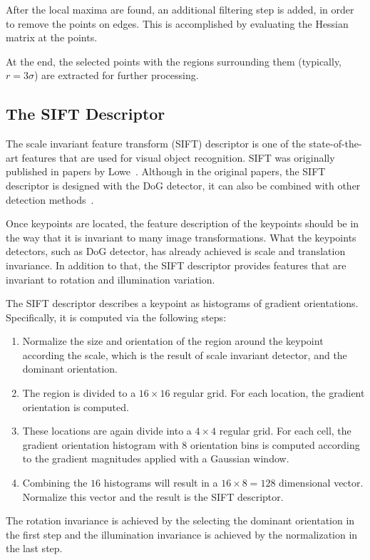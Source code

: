 \documentclass[12pt,final,twoside]{report}
\theoremstyle{plain}
\theoremstyle{definition}
\theoremstyle{remark}
\begin{document}
After the local maxima are found, an additional filtering step is added, in order to remove the points on edges. This is accomplished by evaluating the Hessian matrix at the points.

At the end, the selected points with the regions surrounding them (typically, $r = 3\sigma$) are extracted for further processing.

\subsection{The SIFT Descriptor}
The scale invariant feature transform (SIFT) descriptor is one of the state-of-the-art features that are used for visual object recognition. SIFT was originally published in papers by Lowe~\cite{lowe_object_1999,lowe_distinctive_2004}. 
Although in the original papers, the SIFT descriptor is designed with the DoG detector, it can also be combined with other detection methods~\cite{mikolajczyk_performance_2005}.

Once keypoints are located, the feature description of the keypoints should be in the way that it is invariant to many image transformations. What the keypoints detectors, such as DoG detector, has already achieved is scale and translation invariance. In addition to that, the SIFT descriptor provides features that are invariant to rotation and illumination variation.

The SIFT descriptor describes a keypoint as histograms of gradient orientations. Specifically, it is computed via the following steps:
\begin{enumerate}
  \item Normalize the size and orientation of the region around the keypoint according the scale, which is the result of scale invariant detector, and the dominant orientation.
  \item The region is divided to a $16 \times 16$ regular grid. For each location, the gradient orientation is computed.
  \item These locations are again divide into a $4 \times 4$ regular grid. For each cell, the gradient orientation histogram with 8 orientation bins is computed according to the gradient magnitudes applied with a Gaussian window.
  \item Combining the $16$ histograms will result in a $16 \times 8 = 128$ dimensional vector. Normalize this vector and the result is the SIFT descriptor.
\end{enumerate}

The rotation invariance is achieved by the selecting the dominant orientation in the first step and the illumination invariance is achieved by the normalization in the last step.
\end{document}
